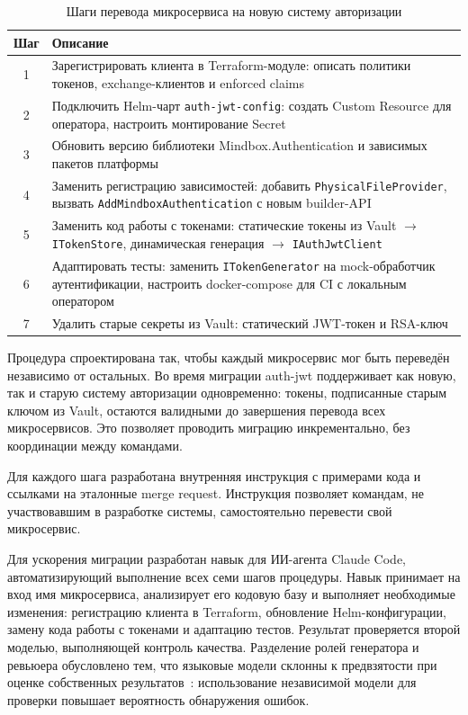 \begin{table}[h]
  \centering
  \caption{Шаги перевода микросервиса на новую систему авторизации}
  \label{tab:migration-steps}
  \begin{tabularx}{\textwidth}{c X}
    \hline
    \textbf{Шаг} & \textbf{Описание} \\
    \hline
    1 & Зарегистрировать клиента в Terraform-модуле:
        описать политики токенов, exchange-клиентов и enforced claims \\
    2 & Подключить Helm-чарт \texttt{auth-jwt-config}:
        создать Custom Resource для оператора,
        настроить монтирование Secret \\
    3 & Обновить версию библиотеки Mindbox.Authentication
        и зависимых пакетов платформы \\
    4 & Заменить регистрацию зависимостей:
        добавить \texttt{PhysicalFileProvider},
        вызвать \texttt{AddMindboxAuthentication} с новым builder-API \\
    5 & Заменить код работы с токенами:
        статические токены из Vault $\rightarrow$ \texttt{ITokenStore},
        динамическая генерация $\rightarrow$ \texttt{IAuthJwtClient} \\
    6 & Адаптировать тесты:
        заменить \texttt{ITokenGenerator} на mock-обработчик аутентификации,
        настроить docker-compose для CI с локальным оператором \\
    7 & Удалить старые секреты из Vault:
        статический JWT-токен и RSA-ключ \\
    \hline
  \end{tabularx}
\end{table}

Процедура спроектирована так,
чтобы каждый микросервис мог быть переведён независимо от остальных.
Во время миграции auth-jwt поддерживает как новую,
так и старую систему авторизации одновременно:
токены, подписанные старым ключом из Vault,
остаются валидными до завершения перевода всех микросервисов.
Это позволяет проводить миграцию инкрементально,
без координации между командами.

Для каждого шага разработана внутренняя инструкция
с примерами кода и ссылками на эталонные merge request.
Инструкция позволяет командам, не участвовавшим в разработке системы,
самостоятельно перевести свой микросервис.

Для ускорения миграции разработан навык
для ИИ-агента Claude Code,
автоматизирующий выполнение всех семи шагов процедуры.
Навык принимает на вход имя микросервиса,
анализирует его кодовую базу и выполняет необходимые изменения:
регистрацию клиента в Terraform,
обновление Helm-конфигурации,
замену кода работы с токенами
и адаптацию тестов.
Результат проверяется второй моделью,
выполняющей контроль качества.
Разделение ролей генератора и ревьюера обусловлено тем,
что языковые модели склонны к предвзятости
при оценке собственных результатов~\cite{Zahraei2026}:
использование независимой модели для проверки
повышает вероятность обнаружения ошибок.

